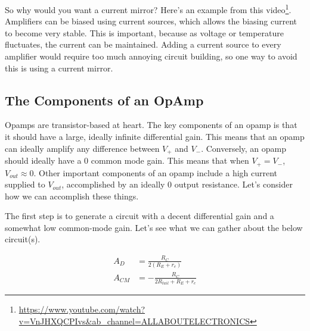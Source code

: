 \documentclass[12pt]{report}
\newcommand{\Vo}{{V}_{out}}
\begin{document}
So why would you want a current mirror? Here's an example from this video\footnote{\url{https://www.youtube.com/watch?v=VnJHXQCPIvs\&ab_channel=ALLABOUTELECTRONICS}}. Amplifiers can be biased using current sources, which allows the biasing current to become very stable. This is important, because as voltage or temperature fluctuates, the current can be maintained. Adding a current source to every amplifier would require too much annoying circuit building, so one way to avoid this is using a current mirror. 

\subsection{The Components of an OpAmp}

Opamps are transistor-based at heart. The key components of an opamp is that it should have a large, ideally infinite differential gain. This means that an opamp can ideally amplify any difference between $V_+$ and $V_-$. Conversely, an opamp should ideally have a 0 common mode gain. This means that when $V_+ = V_-$, $\Vo \approx 0$. Other important components of an opamp include a high current supplied to $\Vo$, accomplished by an ideally 0 output resistance. Let's consider how we can accomplish these things.\newline

The first step is to generate a circuit with a decent differential gain and a somewhat low common-mode gain. Let's see what we can gather about the below circuit(s). 

\begin{equation}\label{sec:diffgain}
\begin{split}
    A_{D} &= \frac{R_C}{2(R_E + r_e)}\\
    A_{CM} &= -\frac{R_C}{2R_{tail} + R_E + r_e} 
\end{split}
\end{equation}
\end{document}
